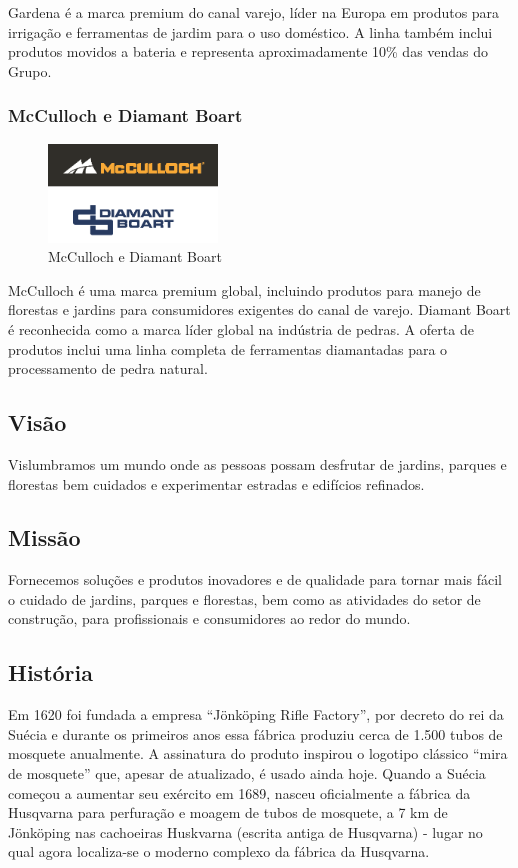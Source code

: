 \documentclass[12pt]{article}
\begin{document}
	Gardena é a marca premium do canal varejo, líder na Europa em produtos para irrigação e ferramentas de jardim para o uso doméstico. A linha também inclui produtos movidos a bateria e representa aproximadamente 10\% das vendas do Grupo.

\subsubsection{McCulloch e Diamant Boart}

\begin{figure}[h!]
	\centering
	\includegraphics[width=0.4\textwidth]{img/logo-mcdb.png}
	\caption{McCulloch e Diamant Boart}
\end{figure}

	McCulloch é uma marca premium global, incluindo produtos para manejo de florestas e jardins para consumidores exigentes do canal de varejo. 
	Diamant Boart é reconhecida como a marca líder global na indústria de pedras. A oferta de produtos inclui uma linha completa de ferramentas diamantadas para o processamento de pedra natural.	

\subsection{Visão}
	Vislumbramos um mundo onde as pessoas possam desfrutar de jardins, parques e florestas bem cuidados e experimentar estradas e edifícios refinados.

\subsection{Missão}
	Fornecemos soluções e produtos inovadores e de qualidade para tornar mais fácil o cuidado de jardins, parques e florestas, bem como as atividades do setor de construção, para profissionais e consumidores ao redor do mundo.

	
\subsection{História}
	Em 1620 foi fundada a empresa “Jönköping Rifle Factory”, por decreto do rei da Suécia e durante os primeiros anos essa fábrica produziu cerca de 1.500 tubos de mosquete anualmente. A assinatura do produto inspirou o logotipo clássico “mira de mosquete” que, apesar de atualizado, é usado ainda hoje.
	Quando a Suécia começou a aumentar seu exército em 1689, nasceu oficialmente a fábrica da Husqvarna para perfuração e moagem de tubos de mosquete, a 7 km de Jönköping nas cachoeiras Huskvarna (escrita antiga de Husqvarna) - lugar no qual agora localiza-se o moderno complexo da fábrica da Husqvarna.
\end{document}
